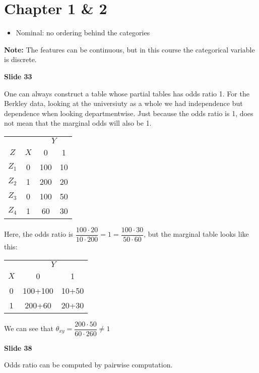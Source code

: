 \section{Chapter 1 \& 2}
\begin{itemize}
  \item Nominal: no ordering behind the categories
\end{itemize}
\par\bigskip
\noindent\textbf{Note:} The features can be continuous, but in this course the categorical variable is discrete.
\par\bigskip
\noindent \textbf{Slide 33}\par
\noindent One can always construct a table whose partial tables has odds ratio 1. For the Berkley data, looking at the universiuty as a whole we had independence but dependence when looking departmentwise. Just because the odds ratio is 1, does not mean that the marginal odds will also be 1.
\par\bigskip
\begin{center}
  \begin{tabular}{cccc}
    && \multicolumn{2}{c}{$Y$} \\
    \cmidrule{3-4}
    $Z$&$X$&0&1\\
    \midrule 
       $Z_1$&0&100&10\\
       $Z_2$&1&200&20\\
       $Z_3$&0&100&50\\
       $Z_4$&1&60&30\\
  \end{tabular}
\end{center}\par
\noindent Here, the odds ratio is $\dfrac{100\cdot20}{10\cdot200} = 1 = \dfrac{100\cdot30}{50\cdot60}$, but the marginal table looks like this:
\begin{center}
  \begin{tabular}{ccc}
    &\multicolumn{2}{c}{$Y$}\\
    \cmidrule{2-3}
    $X$&0&1\\
    \midrule
    0&100+100&10+50\\
    1&200+60&20+30
  \end{tabular}
\end{center}\par
\noindent We can see that $\theta_{xy} = \dfrac{200\cdot50}{60\cdot260}\neq1$ 
\par\bigskip
\noindent\textbf{Slide 38}\par
\noindent Odds ratio can be computed by pairwise computation.\par
